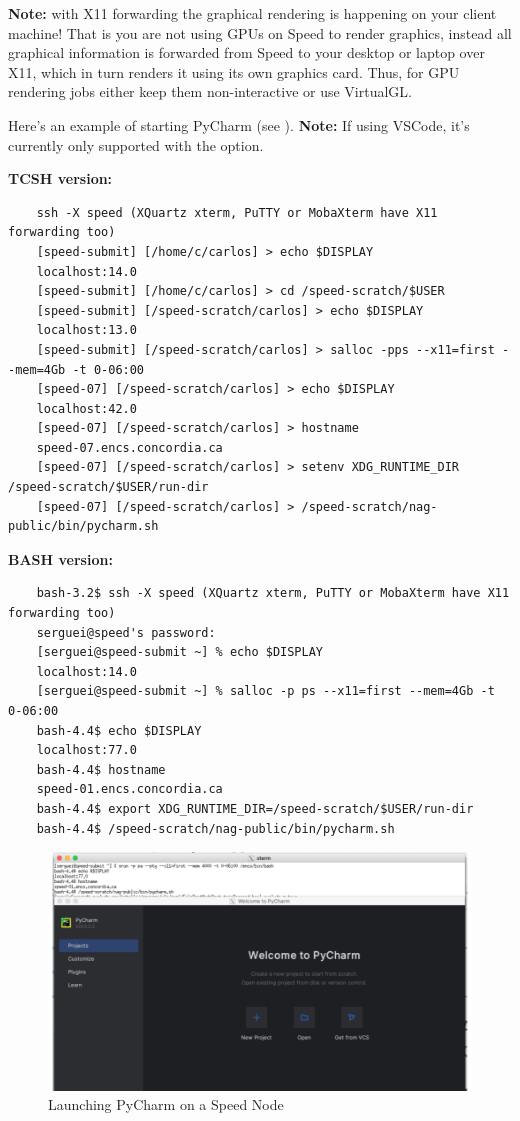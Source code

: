 \noindent\textbf{Note:} with X11 forwarding the graphical rendering is happening on your client machine!
That is you are not using GPUs on Speed to render graphics,
instead all graphical information is forwarded from Speed to your desktop or laptop over X11,
which in turn renders it using its own graphics card. Thus, for GPU rendering jobs either keep them
non-interactive or use VirtualGL.

\noindent Here's an example of starting PyCharm (see ).
\textbf{Note:} If using VSCode, it's currently only supported with the  option.

\textbf{TCSH version:}
\small
\begin{verbatim}
    ssh -X speed (XQuartz xterm, PuTTY or MobaXterm have X11 forwarding too)
    [speed-submit] [/home/c/carlos] > echo $DISPLAY
    localhost:14.0
    [speed-submit] [/home/c/carlos] > cd /speed-scratch/$USER
    [speed-submit] [/speed-scratch/carlos] > echo $DISPLAY
    localhost:13.0
    [speed-submit] [/speed-scratch/carlos] > salloc -pps --x11=first --mem=4Gb -t 0-06:00
    [speed-07] [/speed-scratch/carlos] > echo $DISPLAY
    localhost:42.0
    [speed-07] [/speed-scratch/carlos] > hostname
    speed-07.encs.concordia.ca
    [speed-07] [/speed-scratch/carlos] > setenv XDG_RUNTIME_DIR /speed-scratch/$USER/run-dir
    [speed-07] [/speed-scratch/carlos] > /speed-scratch/nag-public/bin/pycharm.sh
\end{verbatim}
\normalsize

\textbf{BASH version:}
\small
    \begin{verbatim}
    bash-3.2$ ssh -X speed (XQuartz xterm, PuTTY or MobaXterm have X11 forwarding too)
    serguei@speed's password:
    [serguei@speed-submit ~] % echo $DISPLAY
    localhost:14.0
    [serguei@speed-submit ~] % salloc -p ps --x11=first --mem=4Gb -t 0-06:00
    bash-4.4$ echo $DISPLAY
    localhost:77.0
    bash-4.4$ hostname
    speed-01.encs.concordia.ca
    bash-4.4$ export XDG_RUNTIME_DIR=/speed-scratch/$USER/run-dir
    bash-4.4$ /speed-scratch/nag-public/bin/pycharm.sh
\end{verbatim}
\normalsize

\begin{figure}[htpb]
	\includegraphics[width=\columnwidth]{images/pycharm}
	\caption{Launching PyCharm on a Speed Node}
	\label{fig:pycharm}
\end{figure}

